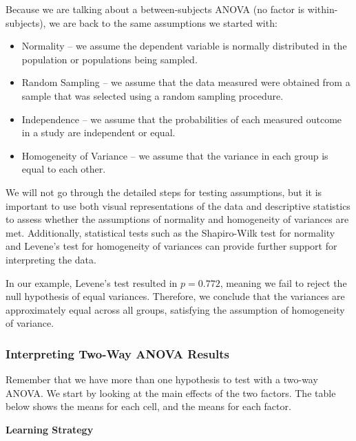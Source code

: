 \documentclass[
  letterpaper,
  DIV=11,
  numbers=noendperiod]{scrreprt}
\begin{document}
Because we are talking about a between-subjects ANOVA (no factor is
within-subjects), we are back to the same assumptions we started with:\,

\begin{itemize}
\item
  Normality -- we assume the dependent variable is normally distributed
  in the population or populations being sampled.
\item
  Random Sampling -- we assume that the data measured were obtained from
  a sample that was selected using a random sampling procedure.\,
\item
  Independence -- we assume that the probabilities of each measured
  outcome in a study are independent or equal.\,\,
\item
  Homogeneity of Variance -- we assume that the variance in each group
  is equal to each other.\,
\end{itemize}

We will not go through the detailed steps for testing assumptions, but
it is important to use both visual representations of the data and
descriptive statistics to assess whether the assumptions of normality
and homogeneity of variances are met. Additionally, statistical tests
such as the Shapiro-Wilk test for normality and Levene's test for
homogeneity of variances can provide further support for interpreting
the data.

In our example, Levene's test resulted in \(p = 0.772\), meaning we fail
to reject the null hypothesis of equal variances. Therefore, we conclude
that the variances are approximately equal across all groups, satisfying
the assumption of homogeneity of variance.

\subsubsection*{Interpreting Two-Way ANOVA
Results\,}\label{interpreting-two-way-anova-results}

Remember that we have more than one hypothesis to test with a two-way
ANOVA. We start by looking at the main effects of the two factors. The
table below shows the means for each cell, and the means for each
factor.\,

\textbf{Learning Strategy}
\end{document}
